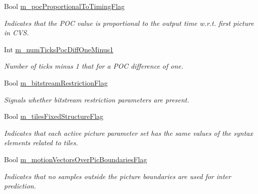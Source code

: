 \begin{DoxyCompactItemize}
\mbox{\label{class_t_enc_cfg_aa4059bbd48a87dc6c68665ebf224ffa9}} 
Bool \hyperlink{class_t_enc_cfg_aa4059bbd48a87dc6c68665ebf224ffa9}{m\+\_\+poc\+Proportional\+To\+Timing\+Flag}
\begin{DoxyCompactList}\small\item\em Indicates that the P\+OC value is proportional to the output time w.\+r.\+t. first picture in C\+VS. \end{DoxyCompactList}\item 
\mbox{\label{class_t_enc_cfg_aee36edb9d25e5735c929bf4d6b3d0cb3}} 
Int \hyperlink{class_t_enc_cfg_aee36edb9d25e5735c929bf4d6b3d0cb3}{m\+\_\+num\+Ticks\+Poc\+Diff\+One\+Minus1}
\begin{DoxyCompactList}\small\item\em Number of ticks minus 1 that for a P\+OC difference of one. \end{DoxyCompactList}\item 
\mbox{\label{class_t_enc_cfg_ac950da664bdc222f1bcc7eaf029b8877}} 
Bool \hyperlink{class_t_enc_cfg_ac950da664bdc222f1bcc7eaf029b8877}{m\+\_\+bitstream\+Restriction\+Flag}
\begin{DoxyCompactList}\small\item\em Signals whether bitstream restriction parameters are present. \end{DoxyCompactList}\item 
\mbox{\label{class_t_enc_cfg_a450106a576a4aa99ba8ec7588316ab78}} 
Bool \hyperlink{class_t_enc_cfg_a450106a576a4aa99ba8ec7588316ab78}{m\+\_\+tiles\+Fixed\+Structure\+Flag}
\begin{DoxyCompactList}\small\item\em Indicates that each active picture parameter set has the same values of the syntax elements related to tiles. \end{DoxyCompactList}\item 
\mbox{\label{class_t_enc_cfg_a9b569a3dd21f07d01f8d2b6f3ce87636}} 
Bool \hyperlink{class_t_enc_cfg_a9b569a3dd21f07d01f8d2b6f3ce87636}{m\+\_\+motion\+Vectors\+Over\+Pic\+Boundaries\+Flag}
\begin{DoxyCompactList}\small\item\em Indicates that no samples outside the picture boundaries are used for inter prediction. \end{DoxyCompactList}\item 

\end{DoxyCompactItemize}
